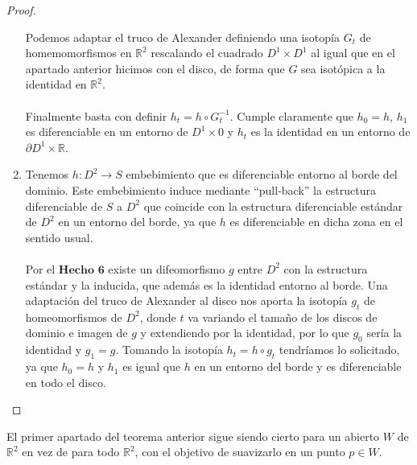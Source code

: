 \begin{proof}
\begin{enumerate}
			Podemos adaptar el truco de Alexander definiendo una isotopía $G_t$ de homemomorfismos en $\mathbb{R}^2$ rescalando el cuadrado $D^1 \times D^1$ al igual que en el apartado anterior hicimos con el disco, de forma que $G$ sea isotópica a la identidad en $\mathbb{R}^2$.\\
			\\ Finalmente basta con definir $h_t = h \circ G_t^{-1}$. Cumple claramente que $h_0 = h$, $h_1$ es diferenciable en un entorno de $D^1 \times 0$ y $h_t$ es la identidad en un entorno de $\partial D^1 \times \mathbb{R}$.
		\item Tenemos $h: D^2 \rightarrow S$ embebimiento que es diferenciable entorno al borde del dominio. Este embebimiento induce mediante ``pull-back'' la estructura diferenciable de $S$ a $D^2$ que coincide con la estructura diferenciable estándar de $D^2$ en un entorno del borde, ya que $h$ es diferenciable en dicha zona en el sentido usual.\\
			\\ Por el $\textbf{Hecho 6}$ existe un difeomorfismo $g$ entre $D^2$ con la estructura estándar y la inducida, que además es la identidad entorno al borde. Una adaptación del truco de Alexander al disco nos aporta la isotopía $g_t$ de homeomorfismos de $D^2$, donde $t$ va variando el tamaño de los discos de dominio e imagen de $g$ y extendiendo por la identidad, por lo que $g_0$ sería la identidad y $g_1 = g$. Tomando la isotopía $h_t = h \circ g_t$ tendríamos lo solicitado, ya que $h_0 = h$ y $h_1$ es igual que $h$ en un entorno del borde y es diferenciable en todo el disco.
	\end{enumerate}
	
\end{proof}


\begin{corolario}
	El primer apartado del teorema anterior sigue siendo cierto para un abierto $W$ de $\mathbb{R}^2$ en vez de para todo $\mathbb{R}^2$, con el objetivo de suavizarlo en un punto $p \in W$.
\end{corolario}

